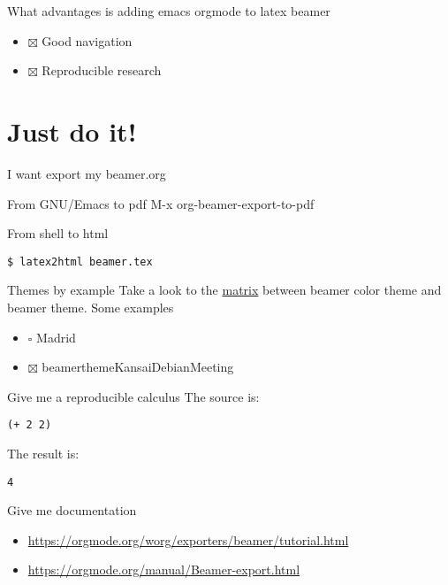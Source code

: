 \documentclass[unicode,presentation,c,squeeze,shrink,10pt]{beamer}
\begin{document}
\begin{frame}[label=sec-2-2]{What advantages is adding emacs orgmode to latex beamer}
\begin{itemize}
\item $\boxtimes$ Good navigation
\item $\boxtimes$ Reproducible research
\end{itemize}
\end{frame}
\section{Just do it!}
\label{sec-3}
\begin{frame}[fragile,label=sec-3-1]{I want export my beamer.org}
 \begin{block}{From GNU/Emacs to pdf}
M-x org-beamer-export-to-pdf
\end{block}
\begin{block}{From shell to html}
\begin{verbatim}
$ latex2html beamer.tex
\end{verbatim}
\end{block}
\end{frame}
\begin{frame}[label=sec-3-2]{Themes by example}
Take a look to the \href{http://deic.uab.es/~iblanes/beamer_gallery/index_by_theme.html}{matrix} between beamer color theme and beamer theme.
Some examples
\begin{itemize}
\item $\square$ Madrid
\item $\boxtimes$ beamerthemeKansaiDebianMeeting
\end{itemize}
\end{frame}
\begin{frame}[fragile,label=sec-3-3]{Give me a reproducible calculus}
 The source is:
\begin{verbatim}
(+ 2 2)
\end{verbatim}

The result is:
\begin{verbatim}
4
\end{verbatim}
\end{frame}

\begin{frame}[label=sec-3-4]{Give me documentation}
\begin{itemize}
\item \url{https://orgmode.org/worg/exporters/beamer/tutorial.html}
\item \url{https://orgmode.org/manual/Beamer-export.html}
\end{itemize}
\end{frame}
\end{document}
